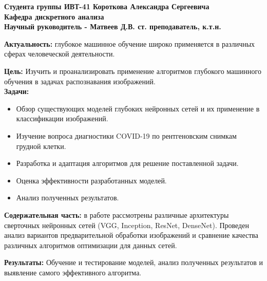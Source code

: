 \documentclass[xetex, a4paper,12pt]{extarticle}
\begin{document}


\vspace{2em}
\vspace{2em}

\begin{flushleft}
\textbf{
    Студента группы ИВТ-41 Короткова Александра Сергеевича\\
    Кафедра дискретного анализа\\
    Научный руководитель - Матвеев Д.В. ст. преподаватель, к.т.н.
}
\vspace{2em}
    
\textbf{Актуальность:} глубокое машинное обучение широко применяется в различных сферах человеческой деятельности. 
\vspace{1em}

\textbf{Цель:} Изучить и проанализировать применение алгоритмов глубокого машинного обучения в задачах распознавания изображений. \\

\textbf{Задачи: }
\begin{itemize}
    \item Обзор существующих моделей глубоких нейронных сетей и их применение в классификации изображений.
    \item Изучение вопроса диагностики COVID-19 по рентгеновским снимкам грудной клетки. 
    \item Разработка и адаптация алгоритмов для решение поставленной задачи.
    \item Оценка эффективности разработанных моделей.
    \item Анализ полученных результатов.
\end{itemize}
\vspace{1em}

\textbf{Содержательная часть:} в работе рассмотрены различные архитектуры сверточных нейронных сетей (VGG, Inception, ResNet, DenseNet). Проведен анализ вариантов предварительной обработки изображений и сравнение качества различных алгоритмов оптимизации для данных сетей. 
\vspace{1em}

\textbf{Результаты:} Обучение и тестирование моделей, анализ полученных результатов и выявление самого эффективного алгоритма.
\vspace{1em}

\end{flushleft}
\end{document}

